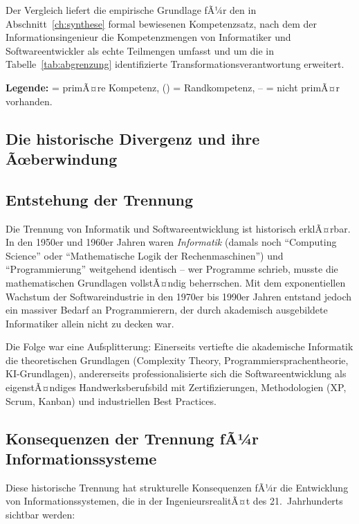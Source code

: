 ﻿\documentclass[a4paper,12pt]{report}
\theoremstyle{definition}
\begin{document}
Der Vergleich liefert die empirische Grundlage fÃ¼r den in Abschnitt~\ref{ch:synthese} formal bewiesenen Kompetenzsatz, nach dem der Informationsingenieur die Kompetenzmengen von Informatiker und Softwareentwickler als echte Teilmengen umfasst und um die in Tabelle~\ref{tab:abgrenzung} identifizierte Transformationsverantwortung erweitert.

\noindent
\textbf{Legende:} \checkmark = primÃ¤re Kompetenz, (\checkmark) = Randkompetenz, -- = nicht primÃ¤r vorhanden.

\subsection{Die historische Divergenz und ihre Ãœberwindung}

\subsection{Entstehung der Trennung}

Die Trennung von Informatik und Softwareentwicklung ist historisch erklÃ¤rbar. In den
1950er und 1960er Jahren waren \emph{Informatik} (damals noch \enquote{Computing Science}
oder \enquote{Mathematische Logik der Rechenmaschinen}) und \enquote{Programmierung}
weitgehend identisch -- wer Programme schrieb, musste die mathematischen Grundlagen
vollstÃ¤ndig beherrschen. Mit dem exponentiellen Wachstum der Softwareindustrie in
den 1970er bis 1990er Jahren entstand jedoch ein massiver Bedarf an Programmierern,
der durch akademisch ausgebildete Informatiker allein nicht zu decken war.

Die Folge war eine Aufsplitterung: Einerseits vertiefte die akademische Informatik die
theoretischen Grundlagen (Complexity Theory, Programmiersprachentheorie, KI-Grundlagen),
andererseits professionalisierte sich die Softwareentwicklung als eigenstÃ¤ndiges
Handwerksberufsbild mit Zertifizierungen, Methodologien (XP, Scrum, Kanban) und
industriellen Best Practices.

\subsection{Konsequenzen der Trennung fÃ¼r Informationssysteme}

Diese historische Trennung hat strukturelle Konsequenzen fÃ¼r die Entwicklung von
Informationssystemen, die in der IngenieursrealitÃ¤t des 21.~Jahrhunderts sichtbar werden:
\end{document}
